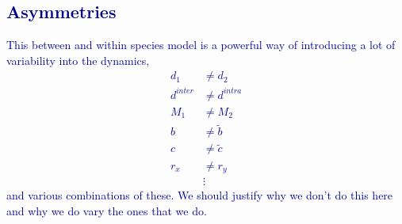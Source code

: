 \documentclass[12pt]{article}
\newcommand{\cha}[1]{\textcolor{darkblue}{#1}}
\begin{document}
\begin{appendices}
\cha{\section*{Asymmetries}}

\cha{This between and within species model is a powerful way of introducing a lot of variability into the dynamics,
\begin{align}
	d_1 &\neq d_2 \\
	d^{inter} &\neq d^{intra} \\
	M_1 &\neq M_2 \\
	b &\neq \tilde{b} \\
	c &\neq \tilde{c} \\
	r_x &\neq r_y \\
	&\vdots
\end{align}
and various combinations of these. We should justify why we don't do this here and why we do vary the ones that we do.}


%
%
%



\end{appendices}
\end{document}
